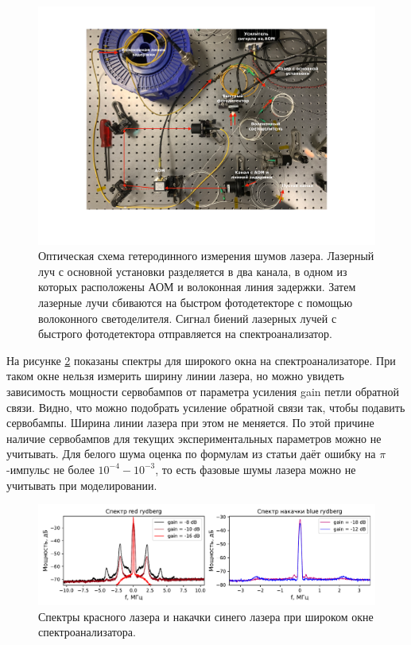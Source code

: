 \begin{figure}[H]
	\centering
	\includegraphics[width=1.0\textwidth]{images/heterodyne_measurement.pdf}
	\caption{Оптическая схема гетеродинного измерения шумов лазера. Лазерный луч с основной установки разделяется в два канала, в одном из которых расположены АОМ и волоконная линия задержки. Затем лазерные лучи сбиваются на быстром фотодетекторе с помощью волоконного светоделителя. Сигнал биений лазерных лучей с быстрого фотодетектора отправляется на спектроанализатор.}
	\label{fig:heterodyne_measurement}
\end{figure}

На рисунке \ref{fig:laser_spectrums_wide} показаны спектры для широкого окна на спектроанализаторе. При таком окне нельзя измерить ширину линии лазера, но можно увидеть зависимость мощности сервобампов от параметра усиления gain петли обратной связи. Видно, что можно подобрать усиление обратной связи так, чтобы подавить сервобампы. Ширина линии лазера при этом не меняется. По этой причине наличие сервобампов \cite{PhysRevApplied.18.064005} для текущих экспериментальных параметров можно не учитывать. Для белого шума оценка по формулам из статьи \cite{Saffman_Noise} даёт ошибку на $\pi$-импульс не более $10^{-4}-10^{-3}$, то есть фазовые шумы лазера можно не учитывать при моделировании. 

\begin{figure}[H]
	\centering
	\includegraphics[width=1.0\textwidth]{images/laser_spectrums_wide.pdf}
	\caption{Спектры красного лазера и накачки синего лазера при широком окне спектроанализатора.}
	\label{fig:laser_spectrums_wide}
\end{figure}

